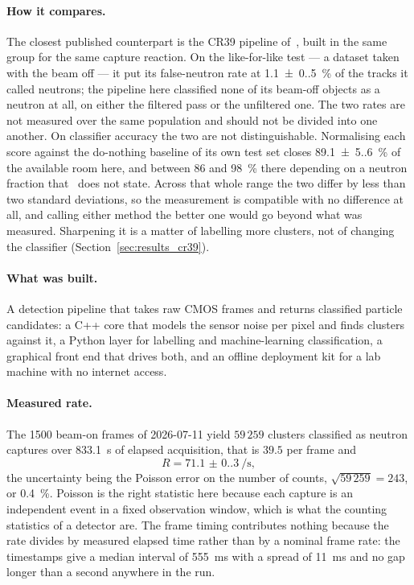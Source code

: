\documentclass[a4paper,headsepline,oneside,11pt]{scrartcl}
\begin{document}
\paragraph{How it compares.} The closest published counterpart is the CR39
pipeline of~\cite{Filter2018}, built in the same group for the same capture
reaction. On the like-for-like test --- a dataset taken with the beam off --- it
put its false-neutron rate at \SI{1.1(0.5)}{\percent} of the tracks it called
neutrons; the pipeline here classified none of its beam-off objects as a neutron
at all, on either the filtered pass or the unfiltered one. The two rates are not
measured over the same population and should not be divided into one another. On
classifier accuracy the two are
not distinguishable. Normalising each score against the do-nothing baseline of
its own test set closes \SI{89.1(5.6)}{\percent} of the available room here, and
between $86$ and \SI{98}{\percent} there depending on a neutron fraction
that~\cite{Filter2018} does not state. Across that whole range the two differ by
less than two standard deviations, so the measurement is compatible with no
difference at all, and calling either method the better one would go beyond what
was measured. Sharpening it is a
matter of labelling more clusters, not of changing the classifier
(Section~\ref{sec:results_cr39}).

\paragraph{What was built.} A detection pipeline that takes raw CMOS frames and
returns classified particle candidates: a C++ core that models the sensor noise
per pixel and finds clusters against it, a Python layer for labelling and
machine-learning classification, a graphical front end that drives both, and an
offline deployment kit for a lab machine with no internet access.

\paragraph{Measured rate.} The 1500 beam-on frames of 2026-07-11 yield
$59\,259$ clusters classified as neutron captures over \SI{833.1}{\second} of elapsed
acquisition, that is $39.5$ per frame and
%
\begin{equation}
  R = \SI[per-mode=reciprocal]{71.1(0.3)}{\per\second},
  \label{eq:rate}
\end{equation}
%
the uncertainty being the Poisson error on the number of counts, $\sqrt{59\,259}
= 243$, or \SI{0.4}{\percent}. Poisson is the right statistic here because each capture is
an independent event in a fixed observation window, which is what the counting
statistics of a detector are. The frame timing contributes nothing because the
rate divides by measured elapsed time rather than by a nominal frame rate: the
timestamps give a median interval of \SI{555}{\milli\second} with a spread of \SI{11}{\milli\second} and no gap
longer than a second anywhere in the run.
\end{document}
